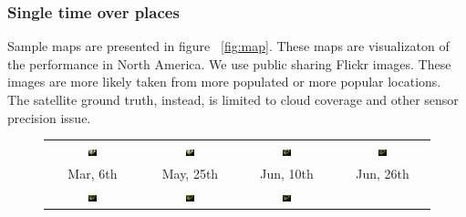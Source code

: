 \subsubsection{Single time over places}

Sample maps are presented in figure ~\ref{fig:map}. These maps are visualizaton of the performance
in North America.
We use public sharing Flickr images.  
These images are more likely taken from more populated or more popular locations. The satellite ground truth, instead, is limited to cloud coverage and other sensor precision issue.



\begin{figure}
\begin{center}
\begin{tabular}{cccc}
\includegraphics[width=0.10\textwidth]{map/72.png} &
\includegraphics[width=0.10\textwidth]{map/77.png} &
\includegraphics[width=0.10\textwidth]{map/78.png} &
\includegraphics[width=0.10\textwidth]{map/79.png}  \\
Mar, 6th&May, 25th&Jun, 10th&Jun, 26th\\
\includegraphics[width=0.10\textwidth]{map/82.png} &
\includegraphics[width=0.10\textwidth]{map/83.png} &
\includegraphics[width=0.10\textwidth]{map/84.png} &

\end{tabular}
\end{center}
\end{figure}
